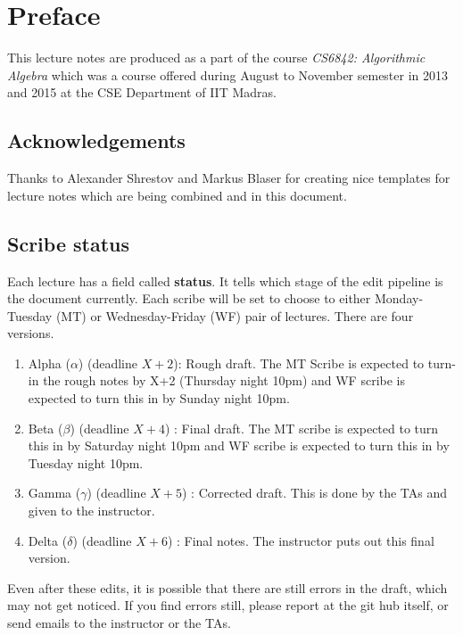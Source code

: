 \chapter*{Preface}

This lecture notes are produced as a part of the course \textit{CS6842: Algorithmic Algebra} which was a course offered during August to November semester in 2013 and 2015 at the CSE Department of IIT Madras.

\section*{Acknowledgements}
Thanks to Alexander Shrestov and Markus Blaser for creating nice templates for lecture notes which are being combined and in this document.

\section*{Scribe status}
Each lecture has a field called {\bf status}. It tells which stage of the edit
pipeline is the document currently. Each scribe will be set to choose to
either Monday-Tuesday (MT) or Wednesday-Friday (WF) pair of lectures.
There are four versions.
\begin{enumerate}
	\item Alpha ($\alpha$) (deadline $X+2$): Rough draft. The MT Scribe is expected
		to turn-in the rough notes by X+2 (Thursday night 10pm) and WF
		scribe is expected to turn this in by Sunday night 10pm.
	\item Beta ($\beta$) (deadline $X+4$) : Final draft. The MT scribe is expected
		to turn this in by Saturday night 10pm and WF scribe is
		expected to turn this in by Tuesday night 10pm.
	\item Gamma ($\gamma$) (deadline $X+5$) : Corrected draft. This is done by the
		TAs and given to the instructor.
	\item Delta ($\delta$) (deadline $X+6$) : Final notes. The instructor puts out 
		this final version.
\end{enumerate}

Even after these edits, it is possible that there are still errors in the draft, which may not get noticed. If you find errors still, please report 
at the git hub itself, or send emails to the instructor or the TAs.
